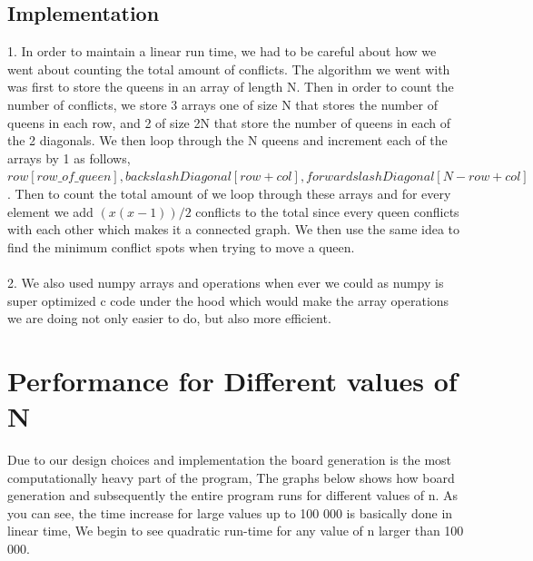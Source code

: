 \documentclass{article}
\begin{document}
 \subsection{Implementation}
 1. In order to maintain a linear run time, we had to be careful about how we went about counting the total amount of conflicts. The algorithm we went with was first to store the queens in an array of length N.
 Then in order to count the number of conflicts, we store 3 arrays one of size N that stores the number of queens in each row, and 2 of size 2N that store the number of queens in each of the 2 diagonals. We then loop
 through the N queens and increment each of the arrays by 1 as follows, $row[row\_of\_queen], backslashDiagonal[row + col], forwardslashDiagonal[N - row + col]$. Then to count the total amount of we loop through these arrays and for every element
 we add $(x(x - 1)) / 2$ conflicts to the total since every queen conflicts with each other which makes it a connected graph. We then use the same idea to find the minimum conflict spots when trying to move a queen.\\
 \\
 2. We also used numpy arrays and operations when ever we could as numpy is super optimized c code under the hood which would make the array operations we are doing not only easier to do, but also more efficient.
\\
\section{Performance for Different values of N}
Due to our design choices and implementation the board generation is the most computationally heavy part of the program, The graphs below shows how board generation and subsequently the entire program runs for different values of n. As you can see, the time increase for large values up to 100 000 is basically done in linear time, We begin to see quadratic run-time for any value of n larger than 100 000.\\
\\
\end{document}
